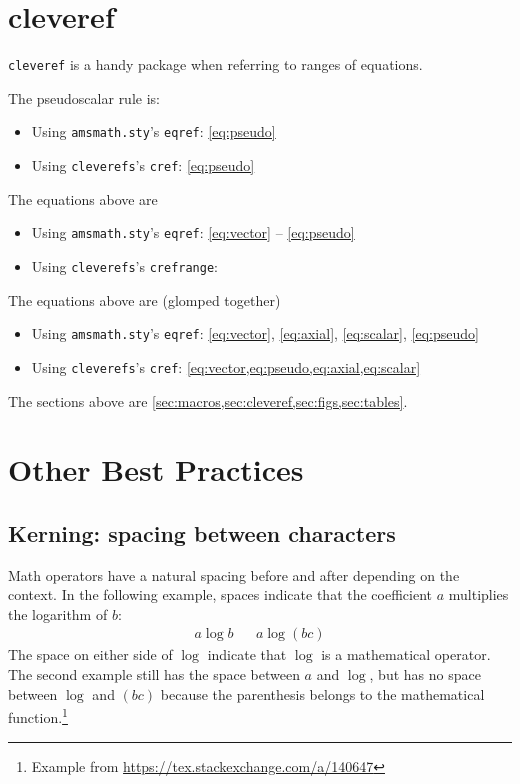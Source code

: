 \section{cleveref}
\label{sec:cleveref}

\texttt{cleveref} is a handy package when referring to ranges of equations. 

The pseudoscalar rule is:
\begin{itemize}
	\item Using \texttt{amsmath.sty}'s \texttt{eqref}: \eqref{eq:pseudo}
	\item Using \texttt{cleverefs}'s \texttt{cref}: \cref{eq:pseudo}
\end{itemize}

The equations above are
\begin{itemize}
	\item Using \texttt{amsmath.sty}'s \texttt{eqref}: \eqref{eq:vector} -- \eqref{eq:pseudo}
	\item Using \texttt{cleverefs}'s \texttt{crefrange}: 
\end{itemize}

The equations above are (glomped together)
\begin{itemize}
	\item Using \texttt{amsmath.sty}'s \texttt{eqref}: \eqref{eq:vector}, \eqref{eq:axial}, \eqref{eq:scalar}, \eqref{eq:pseudo}
	\item Using \texttt{cleverefs}'s \texttt{cref}: \cref{eq:vector,eq:pseudo,eq:axial,eq:scalar}
\end{itemize}

The sections above are \cref{sec:macros,sec:cleveref,sec:figs,sec:tables}.

\section{Other Best Practices}


\subsection{Kerning: spacing between characters}
Math operators have a natural spacing before and after depending on the context. In the following example, spaces indicate that the coefficient $a$ multiplies the logarithm of $b$:
\begin{align}
	a\log b && a\log(bc)
\end{align}
The space on either side of $\log$ indicate that $\log$ is a mathematical operator. The second example still has the space between $a$ and $\log$, but has no space between $\log$ and $(bc)$ because the parenthesis belongs to the mathematical function.\footnote{Example from \url{https://tex.stackexchange.com/a/140647}}

